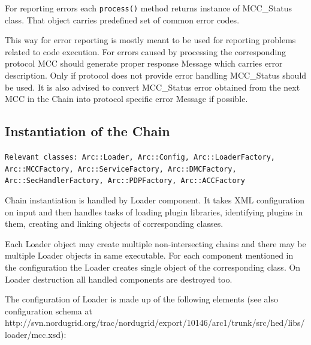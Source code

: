 \documentclass{book}
\begin{document}
For reporting errors each \texttt{process()} method returns instance of MCC\_Status class. That object carries predefined set of common error codes.

This way for error reporting is mostly meant to be used for reporting problems related to code execution. For errors caused by processing the corresponding protocol MCC should generate proper response Message which carries error description. Only if protocol does not provide error handling MCC\_Status should be used. It is also advised to convert MCC\_Status error obtained from the next MCC in the Chain into protocol specific error Message if possible.


\subsection{Instantiation of the Chain}

\texttt{Relevant classes: Arc::Loader, Arc::Config, Arc::LoaderFactory, Arc::MCCFactory, Arc::ServiceFactory, Arc::DMCFactory, Arc::SecHandlerFactory, Arc::PDPFactory, Arc::ACCFactory}

Chain instantiation is handled by Loader component. It takes XML configuration on input and then handles tasks of loading plugin libraries, identifying plugins in them, creating and linking objects of corresponding classes.

Each Loader object may create multiple non-intersecting chains and there may be multiple Loader objects in same executable. For each component mentioned in the configuration the Loader creates single object of the corresponding class. On Loader destruction all handled components are destroyed too.

The configuration of Loader is made up of the following elements (see also configuration schema at http://svn.nordugrid.org/trac/nordugrid/export/10146/arc1/trunk/src/hed/libs/loader/mcc.xsd):
\end{document}

